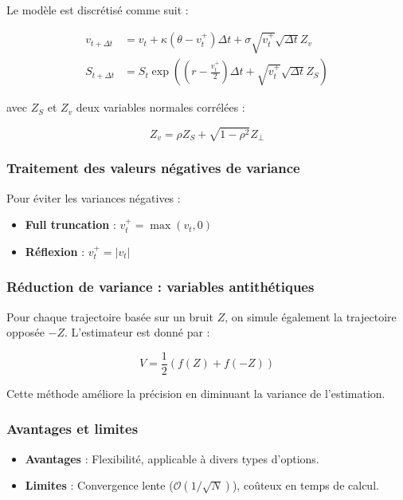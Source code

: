 Le modèle est discrétisé comme suit :

\begin{equation}
	\begin{aligned}
		v_{t+\Delta t} &= v_t + \kappa(\theta - v_t^+)\Delta t + \sigma\sqrt{v_t^+}\sqrt{\Delta t}Z_v \\
		S_{t+\Delta t} &= S_t \exp\left( \left(r - \frac{v_t^+}{2}\right)\Delta t + \sqrt{v_t^+}\sqrt{\Delta t}Z_S \right)
	\end{aligned}
\end{equation}

avec $Z_S$ et $Z_v$ deux variables normales corrélées :

\[
Z_v = \rho Z_S + \sqrt{1 - \rho^2} Z_\perp
\]

\subsubsection{Traitement des valeurs négatives de variance}

Pour éviter les variances négatives :

\begin{itemize}
	\item \textbf{Full truncation} : $v_t^+ = \max(v_t, 0)$
	\item \textbf{Réflexion} : $v_t^+ = |v_t|$
\end{itemize}

\subsubsection{Réduction de variance : variables antithétiques}

Pour chaque trajectoire basée sur un bruit $Z$, on simule également la trajectoire opposée $-Z$. L'estimateur est donné par :

\[
V = \frac{1}{2}(f(Z) + f(-Z))
\]

Cette méthode améliore la précision en diminuant la variance de l'estimation.

\subsubsection{Avantages et limites}

\begin{itemize}
	\item \textbf{Avantages} : Flexibilité, applicable à divers types d'options.
	\item \textbf{Limites} : Convergence lente ($\mathcal{O}(1/\sqrt{N})$), coûteux en temps de calcul.
\end{itemize}

